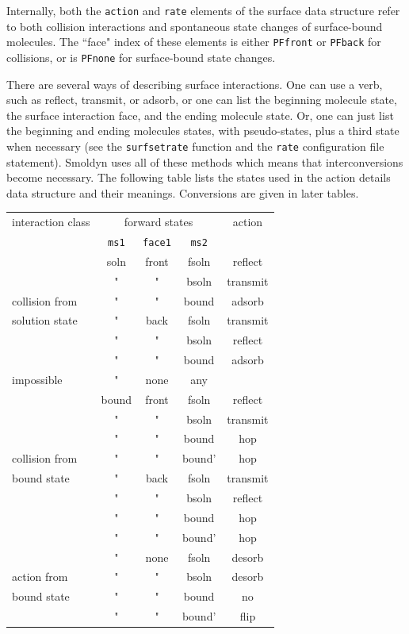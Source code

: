 \documentclass {scrbook}
\newcommand {\ttt} {\texttt}
\begin{document}
Internally, both the \ttt{action} and \ttt{rate} elements of the surface data structure refer to both collision interactions and spontaneous state changes of surface-bound molecules. The ``face" index of these elements is either \ttt{PFfront} or \ttt{PFback} for collisions, or is \ttt{PFnone} for surface-bound state changes.

There are several ways of describing surface interactions. One can use a verb, such as reflect, transmit, or adsorb, or one can list the beginning molecule state, the surface interaction face, and the ending molecule state. Or, one can just list the beginning and ending molecules states, with pseudo-states, plus a third state when necessary (see the \ttt{surfsetrate} function and the \ttt{rate} configuration file statement). Smoldyn uses all of these methods which means that interconversions become necessary. The following table lists the states used in the action details data structure and their meanings. Conversions are given in later tables.

\begin{longtable}[c]{l|ccc|c}
interaction class&\multicolumn{3}{c}{forward states}&action\\
&\ttt{ms1}&\ttt{face1}&\ttt{ms2}\\
\hline
&soln&front&fsoln&reflect\\
&"&"&bsoln&transmit\\
collision from&"&"&bound&adsorb\\
solution state&"&back&fsoln&transmit\\
&"&"&bsoln&reflect\\
&"&"&bound&adsorb\\
\hline
impossible&"&none&any\\
\hline
&bound&front&fsoln&reflect\\
&"&"&bsoln&transmit\\
&"&"&bound&hop\\
collision from&"&"&bound'&hop\\
bound state&"&back&fsoln&transmit\\
&"&"&bsoln&reflect\\
&"&"&bound&hop\\
&"&"&bound'&hop\\
\hline
&"&none&fsoln&desorb\\
action from&"&"&bsoln&desorb\\
bound state&"&"&bound&no\\
&"&"&bound'&flip\\
\end{longtable}
\end{document}
